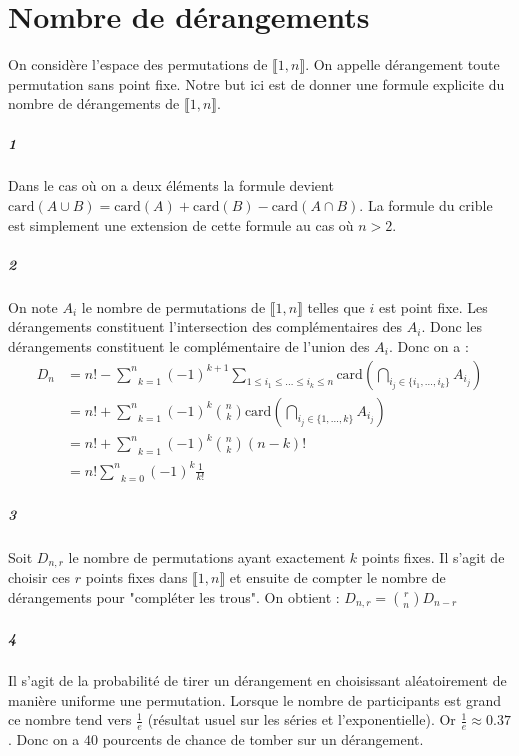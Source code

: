 \documentclass[10pt,a4paper]{article}
\begin{document}
\section{Nombre de dérangements}
On considère l'espace des permutations de $\llbracket 1,n \rrbracket$. On appelle dérangement toute permutation sans point fixe. Notre but ici est de donner une formule explicite du nombre de dérangements de $\llbracket 1,n \rrbracket$.
\subparagraph{1} Dans le cas où on a deux éléments la formule devient $\text{card}(A \cup B) = \text{card}(A)+ \text{card}(B)-\text{card}(A \cap B)$. La formule du crible est simplement une extension de cette formule au cas où $n>2$.
\subparagraph{2}On note $A_i$ le nombre de permutations de $\llbracket 1,n \rrbracket$ telles que $i$ est point fixe. Les dérangements constituent l'intersection des complémentaires des $A_i$. Donc les dérangements constituent le complémentaire de l'union des $A_i$. Donc on a :
\begin{equation}
\begin{aligned}
D_n &= n! - \underset{k=1}{\overset{n}{\sum}}(-1)^{k+1} \underset{1\le i_1 \le \dots \le i_k \le n}{\sum} \text{card} \left( \underset{i_j  \in \lbrace i_1,\dots,i_k \rbrace }{\bigcap} A_{i_j} \right) \\
&= n! + \underset{k=1}{\overset{n}{\sum}}(-1)^{k} \binom{n}{k} \text{card} \left( \underset{i_j  \in \lbrace 1,\dots,k \rbrace }{\bigcap} A_{i_j} \right) \\
&= n! + \underset{k=1}{\overset{n}{\sum}}(-1)^{k} \binom{n}{k} (n-k)! \\
&= n!\underset{k=0}{\overset{n}{\sum}}(-1)^{k} \frac{1}{k!}
\end{aligned}
\end{equation}
\subparagraph{3}Soit $D_{n,r}$ le nombre de permutations ayant exactement $k$ points fixes. Il s'agit de choisir ces $r$ points fixes dans $\llbracket 1,n \rrbracket$ et ensuite de compter le nombre de dérangements pour "compléter les trous". On obtient : $D_{n,r} = \binom{r}{n} D_{n-r}$
\subparagraph{4}Il s'agit de la probabilité de tirer un dérangement en choisissant aléatoirement de manière uniforme une permutation. Lorsque le nombre de participants est grand ce nombre tend vers $\frac{1}{e}$ (résultat usuel sur les séries et l'exponentielle). Or $\frac{1}{e} \approx 0.37$. Donc on a $40$ pourcents de chance de tomber sur un dérangement.
\end{document}
